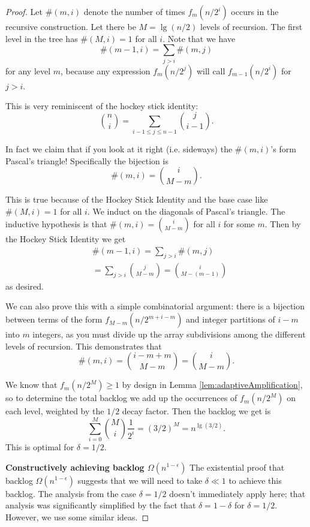 \documentclass[twocolumn]{article}[11pt]
\begin{document}
\begin{proof}
  Let $\#(m, i)$ denote the number of times ${f_m(n/2^i)}$ occurs
  in the recursive construction. Let there be $M = \lg (n/2)$  levels of
  recursion. The first level in the tree has $\#(M, i)=1$ for all $i$. Note
  that we have $$\#(m-1, i) = \sum_{j > i} \#(m, j)$$
  for any level $m$, because any expression $f_m(n/2^j)$ will
  call $f_{m-1}(n/2^i)$ for $j>i$.

  This is very reminiscent of the hockey stick identity:
  $${n \choose i} = \sum_{i-1\le j\le n-1} {j \choose i-1}.$$

  In fact we claim that if you look at it right (i.e. sideways) the $\#(m,
  i)$'s form Pascal's triangle!
  Specifically the bijection is 
  $$\#(m,i) = {i \choose M-m}.$$

  This is true because of the Hockey Stick Identity and the base case
  like $\#(M, i)=1$ for all $i$. We induct on the diagonals of Pascal's
  triangle. The inductive hypothesis is that $\#(m, i) = {i \choose M-m}$ for
  all $i$ for some $m$. Then by the Hockey Stick Identity we get 
  \begin{align*}
  &\#(m-1, i) = \sum_{j>i} \#(m,j) \\
  &= \sum_{j>i} {j \choose M-m} = {i \choose M-(m-1)}
  \end{align*}
  as desired.

  We can also prove this with a simple combinatorial argument: there is a
  bijection between terms of the form $f_{M-m}(n/2^{m+i-m})$ and integer
  partitions of $i-m$ into $m$ integers, as you must divide up the array
  subdivisions among the different levels of recursion. This demonstrates that
  $$\#(m, i) = {i-m+m \choose M-m} = {i \choose M-m}.$$

  We know that $f_m(n/2^M) \ge 1$ by design in Lemma
  \ref{lem:adaptiveAmplification}, so to determine the total backlog we add up
  the occurrences of $f_m(n/2^M)$ on each level, weighted by the
  $1/2$ decay factor. Then the backlog we get is $$\sum_{i=0}^M {M \choose
  i}\frac{1}{2^i} = (3/2)^{M} = n^{\lg(3/2)}.$$
  This is optimal for $\delta= 1/2$.

  \textbf{Constructively achieving backlog $\Omega(n^{1-\epsilon})$}
  The existential proof that backlog $\Omega(n^{1-\epsilon})$ suggests that we
  will need to take $\delta \ll 1$ to achieve this backlog. The analysis from
  the case $\delta = 1/2$ doesn't immediately apply here; that analysis was
  significantly simplified by the fact that $\delta = 1-\delta$ for $\delta =
  1/2$. However, we use some similar ideas.


\end{proof}
\end{document}
